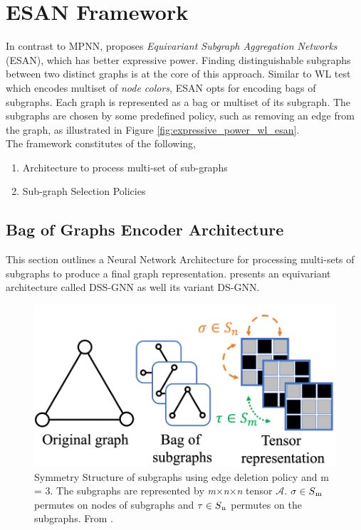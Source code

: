 \documentclass[11pt, dvipsnames, DIV=12]{scrreprt}
\theoremstyle{definition}
\begin{document}
\section{ESAN Framework}
In contrast to MPNN, \citep{beatrice_esan_2021} proposes \emph{Equivariant Subgraph Aggregation Networks} (ESAN), which has better expressive power. Finding distinguishable subgraphs between two distinct graphs is at the core of this approach. Similar to WL test which encodes multiset of \emph{node colors}, ESAN opts for encoding bags of subgraphs. Each graph is represented as a bag or multiset of its subgraph. The subgraphs are chosen by some predefined policy, such as removing an edge from the graph, as illustrated in Figure \ref{fig:expressive_power_wl_esan}.
\\The framework constitutes of the following,
\begin{enumerate}
    \item Architecture to process multi-set of sub-graphs
    \item Sub-graph Selection Policies
\end{enumerate}
\subsection{Bag of Graphs Encoder Architecture}
This section outlines a Neural Network Architecture for processing multi-sets of subgraphs to produce a final graph representation. \citep{beatrice_esan_2021} presents an equivariant architecture called DSS-GNN as well its variant DS-GNN. 

\begin{figure}
    \centering
    \includegraphics[width=.50\textwidth]{figures/symmetries.png}
    \caption{Symmetry Structure of subgraphs using edge deletion policy and m = 3. The subgraphs are represented by \textit{m$\times$n$\times$n} tensor $\mathcal{A}$. \textit{$\sigma \in S\textsubscript{m}$} permutes on nodes of subgraphs and \textit{$\tau \in S\textsubscript{n}$} permutes on the subgraphs. From \cite{GeometricDL_Bronstein_2021}.}
    \label{fig:symmetries}
\end{figure}
\end{document}
